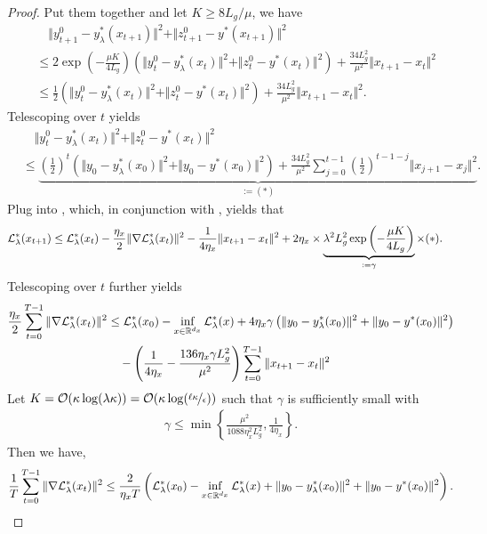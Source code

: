 \begin{proof}
Put them together and let $K \ge 8 L_g/ \mu$, we have
\begin{align} \label{eq:delta_t}
    &\quad \Vert y_{t+1}^0 - y_{\lambda}^*(x_{t+1}) \Vert^2  + \Vert z_{t+1}^0 - y^*(x_{t+1}) \Vert^2 \\
    &\le 2 \exp \left( - \frac{\mu K}{4 L_g} \right) \left(\Vert y_t^0 - y_{\lambda}^*(x_t) \Vert^2 + \Vert z_t^0 - y^*(x_t) \Vert^2 \right) +\frac{34 L_g^2}{\mu^2} \Vert x_{t+1} - x_t \Vert^2 \\
    &\le \frac{1}{2} \left(\Vert y_t^0 - y_{\lambda}^*(x_t) \Vert^2 + \Vert z_t^0 - y^*(x_t) \Vert^2 \right) +\frac{34 L_g^2}{\mu^2} \Vert x_{t+1} - x_t \Vert^2.
\end{align}
Telescoping over $t$ yields
\begin{align*}
    &\quad \Vert y_t^0 - y_{\lambda}^*(x_t) \Vert^2 + \Vert z_t^0 - y^*(x_t) \Vert^2 \\
    &\le \underbrace{\left( \frac{1}{2} \right)^t \left(\Vert y_0 - y_{\lambda}^*(x_0) \Vert^2 + \Vert y_0 - y^*(x_0) \Vert^2 \right) + \frac{34 L_g^2}{\mu^2} \sum_{j=0}^{t-1}  \left( \frac{1}{2}\right)^{t-1-j} \Vert x_{j+1} - x_j \Vert^2}_{:=(*)}.
\end{align*}
Plug into , which, in conjunction with , yields that
\begin{align*}
     {\mathcal{L}}_{\lambda}^*(x_{t+1}) &\le {\mathcal{L}}_{\lambda}^*(x_t) 
    - \frac{\eta_x}{2} \Vert \nabla {\mathcal{L}}_{\lambda}^*(x_t) \Vert^2 - 
    \frac{1}{4\eta_x} \Vert x_{t+1} - x_{t} \Vert^2 + 2 \eta_x \times \underbrace{ \lambda^2 L_g^2 \exp \left( - \frac{\mu K}{4L_g}\right)}_{:=\gamma} \times (*).
\end{align*}
Telescoping over $t$ further yields
\begin{align} \label{eq:final}
\begin{split}
    \frac{\eta_x}{2}\sum_{t=0}^{T-1} \Vert \nabla {\mathcal{L}}_{\lambda}^*(x_t) \Vert^2 &\le {\mathcal{L}}_{\lambda}^*(x_0) - \inf_{x \in {\mathbb{R}}^{d_x}} {\mathcal{L}}_{\lambda}^*(x) + 4 \eta_x \gamma \left(\Vert y_0 - y_{\lambda}^*(x_0) \Vert^2 + \Vert y_0 - y^*(x_0) \Vert^2 \right) \\
    &\quad - \left( \frac{1}{4 \eta_x} - \frac{136 \eta_x \gamma L_g^2}{\mu^2} \right) \sum_{t=0}^{T-1} \Vert x_{t+1} - x_t \Vert^2
\end{split}
\end{align}
Let $K = {\mathcal{O}}(\kappa \log(\lambda \kappa)) = {\mathcal{O}}(\kappa \log(\nicefrac{\ell \kappa}{\epsilon}))$ such that $\gamma$ is sufficiently small with
\begin{align*}
    \gamma \le \min \left\{ \frac{\mu^2}{1088 \eta_x^2 L_g^2}, \frac{1}{4 \eta_x}\right\}.
\end{align*}
Then we have,
\begin{align*}
    \frac{1}{T} \sum_{t=0}^{T-1} \Vert \nabla {\mathcal{L}}_{\lambda}^*(x_t) \Vert^2 \le  \frac{2}{\eta_x T} \left( {\mathcal{L}}_{\lambda}^*(x_0) - \inf_{x \in {\mathbb{R}}^{d_x}} {\mathcal{L}}_{\lambda}^*(x) + \Vert y_0 - y_{\lambda}^*(x_0) \Vert^2 + \Vert y_0 - y^*(x_0) \Vert^2 \right).
\end{align*}
\end{proof}

